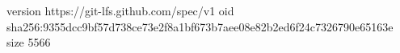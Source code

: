 version https://git-lfs.github.com/spec/v1
oid sha256:9355dcc9bf57d738ce73e2f8a1bf673b7aee08e82b2ed6f24c7326790e65163e
size 5566
